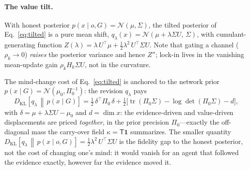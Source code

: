 \documentclass[runningheads]{llncs}
\newcommand{\KL}[2]{D_{\mathrm{KL}}\!\left[#1\,\middle\|\,#2\right]}
\newcommand{\Top}{\mathsf{T}}          %
\newcommand{\bone}{\mathbf{1}}         %
\begin{document}
\paragraph{The value tilt.} With honest posterior $p(x\mid o,G)=\mathcal N(\mu,\Sigma)$, the tilted
posterior of Eq.~\eqref{eq:tilted} is a pure mean shift,
$q_\lambda(x)=\mathcal N(\mu+\lambda\Sigma U,\,\Sigma)$, with cumulant-generating function
$Z(\lambda)=\lambda\,U^{\!\top}\!\mu+\tfrac12\lambda^2\,U^{\!\top}\!\Sigma U$. Note that gating a
channel ($\rho_k\to0$) \emph{raises} the posterior variance and hence $Z''$; lock-in lives in the
vanishing mean-update gain $\rho_k H_k\Sigma U$, not in the curvature.

The mind-change cost of Eq.~\eqref{eq:tilted} is anchored to the network prior
$p(x\mid G)=\mathcal N(\mu_0,\Pi_0^{-1})$: the revision $q_\lambda$ pays
\begin{equation}
\KL{q_\lambda}{p(x\mid G)}
=\tfrac12\,\delta^{\!\top}\Pi_0\,\delta
+\tfrac12\bigl[\operatorname{tr}(\Pi_0\Sigma)-\log\det(\Pi_0\Sigma)-d\bigr],
\label{eq:mindcost}
\end{equation}
with $\delta=\mu+\lambda\Sigma U-\mu_0$ and $d=\dim x$: the evidence-driven and value-driven
displacements are priced \emph{together}, in
the prior precision $\Pi_0$---exactly the off-diagonal mass the carry-over field $\kappa=\Top\bone$
summarizes. The smaller quantity $\KL{q_\lambda}{p(x\mid o,G)}=\tfrac12\lambda^2\,U^{\!\top}\!\Sigma U$
is the fidelity gap to the honest posterior, not the cost of changing one's mind: it would vanish
for an agent that followed the evidence exactly, however far the evidence moved it.
\end{document}
